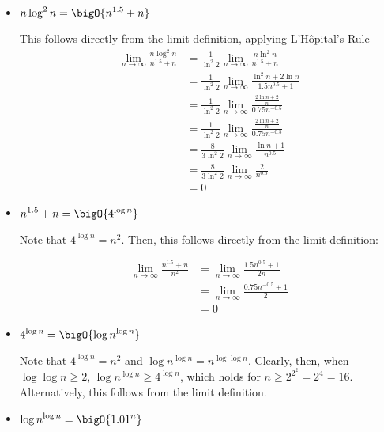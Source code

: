 \documentclass[draft]{article}
\begin{document}
\begin{solution}
\begin{itemize}
        \item $\displaystyle n\log^2{n} =\bigO{n^{1.5} + n}$

              This follows directly from the limit definition, applying L'H\^{o}pital's Rule
              \begin{align*}\lim_{n\to\infty}\frac{n\log^2{n}}{n^{1.5} + n}
                   & = \frac{1}{\ln^2{2}}\lim_{n\to\infty}\frac{n\ln^2{n}}{n^{1.5} + n}              \\
                   & = \frac{1}{\ln^2{2}}\lim_{n\to\infty}\frac{\ln^2{n} + 2\ln{n}}{1.5n^{0.5} + 1}  \\
                   & = \frac{1}{\ln^2{2}}\lim_{n\to\infty}\frac{\frac{2\ln{n} + 2}{n}}{0.75n^{-0.5}} \\
                   & = \frac{1}{\ln^2{2}}\lim_{n\to\infty}\frac{\frac{2\ln{n} + 2}{n}}{0.75n^{-0.5}} \\
                   & = \frac{8}{3\ln^2{2}}\lim_{n\to\infty}\frac{\ln n + 1}{n^{0.5}}                 \\
                   & = \frac{8}{3\ln^2{2}}\lim_{n\to\infty}\frac{2}{n^{0.5}}                         \\
                   & = 0
              \end{align*}

        \item $\displaystyle n^{1.5} + n = \bigO{4^{\log{n}}}$

              Note that $4^{\log{n}} = n^2$. Then, this follows directly from the limit definition:

              \begin{align*}\lim_{n\to\infty}\frac{n^{1.5} + n}{n^2}
                   & = \lim_{n\to\infty} \frac{1.5n^{0.5} + 1}{2n}  \\
                   & = \lim_{n\to\infty} \frac{0.75n^{-0.5} + 1}{2} \\
                   & = 0
              \end{align*}

        \item $\displaystyle 4^{\log{n}} = \bigO{\log{n}^{\log{n}}}$

              Note that $4^{\log{n}} = n^2$ and $\log{n}^{\log{n}} = n^{\log{\log{n}}}$. Clearly, then, when $\log\log{n} \geq 2$, $\log{n}^{\log{n}} \geq 4^{\log{n}}$, which holds for $n \geq 2^{2^2} = 2^4 = 16$. Alternatively, this follows from the limit definition.

        \item $\displaystyle \log{n}^{\log{n}} = \bigO{{1.01}^n}$


\end{itemize}
\end{solution}
\end{document}
